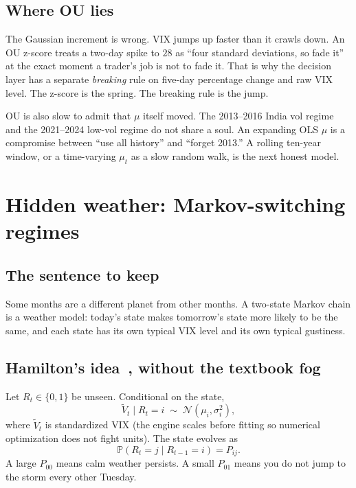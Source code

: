 \documentclass[11pt,a4paper]{article}
\begin{document}
\subsection{Where OU lies}

The Gaussian increment is wrong. VIX jumps up faster than it crawls down. An OU z-score treats a two-day spike to $28$ as ``four standard deviations, so fade it'' at the exact moment a trader's job is not to fade it. That is why the decision layer has a separate \emph{breaking} rule on five-day percentage change and raw VIX level. The z-score is the spring. The breaking rule is the jump.

OU is also slow to admit that $\mu$ itself moved. The 2013--2016 India vol regime and the 2021--2024 low-vol regime do not share a soul. An expanding OLS $\mu$ is a compromise between ``use all history'' and ``forget 2013.'' A rolling ten-year window, or a time-varying $\mu_t$ as a slow random walk, is the next honest model.

\section{Hidden weather: Markov-switching regimes}
\label{ch:markov}

\subsection{The sentence to keep}

Some months are a different planet from other months. A two-state Markov chain is a weather model: today's state makes tomorrow's state more likely to be the same, and each state has its own typical VIX level and its own typical gustiness.

\subsection{Hamilton's idea~\cite{hamilton1989}, without the textbook fog}

Let $R_t\in\{0,1\}$ be unseen. Conditional on the state,
\begin{equation}
  \tilde V_t \mid R_t=i \;\sim\; \mathcal{N}(\mu_i,\sigma_i^2),
\end{equation}
where $\tilde V_t$ is standardized VIX (the engine scales before fitting so numerical optimization does not fight units). The state evolves as
\begin{equation}
  \mathbb{P}(R_t=j\mid R_{t-1}=i)=P_{ij}.
\end{equation}
A large $P_{00}$ means calm weather persists. A small $P_{01}$ means you do not jump to the storm every other Tuesday.
\end{document}
